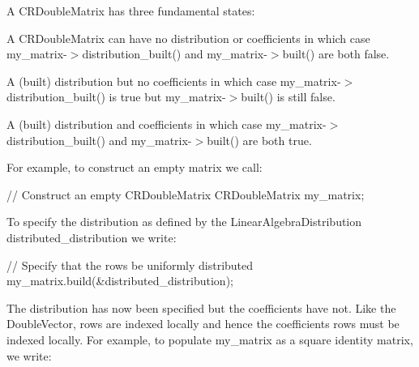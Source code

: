 A {\ttfamily C\+R\+Double\+Matrix} has three fundamental states\+:


\begin{DoxyItemize}
\item A {\ttfamily C\+R\+Double\+Matrix} can have no distribution or coefficients in which case {\ttfamily my\+\_\+matrix-\/$>$distribution\+\_\+built()} and {\ttfamily my\+\_\+matrix-\/$>$built()} are both {\ttfamily false}.
\item A (built) distribution but no coefficients in which case {\ttfamily my\+\_\+matrix-\/$>$distribution\+\_\+built()} is {\ttfamily true} but {\ttfamily my\+\_\+matrix-\/$>$built()} is still {\ttfamily false}.
\item A (built) distribution and coefficients in which case {\ttfamily my\+\_\+matrix-\/$>$distribution\+\_\+built()} and {\ttfamily my\+\_\+matrix-\/$>$built()} are both {\ttfamily true}.
\end{DoxyItemize}

For example, to construct an empty matrix we call\+:


\begin{DoxyCodeInclude}

  
  \textcolor{comment}{// Construct an empty CRDoubleMatrix}
  CRDoubleMatrix my\_matrix;

\end{DoxyCodeInclude}


To specify the distribution as defined by the {\ttfamily Linear\+Algebra\+Distribution} {\ttfamily distributed\+\_\+distribution} we write\+:


\begin{DoxyCodeInclude}

  \textcolor{comment}{// Specify that the rows be uniformly distributed}
  my\_matrix.build(&distributed\_distribution);

\end{DoxyCodeInclude}


The distribution has now been specified but the coefficients have not. Like the {\ttfamily Double\+Vector}, rows are indexed locally and hence the coefficients rows must be indexed locally. For example, to populate {\ttfamily my\+\_\+matrix} as a square identity matrix, we write\+:


